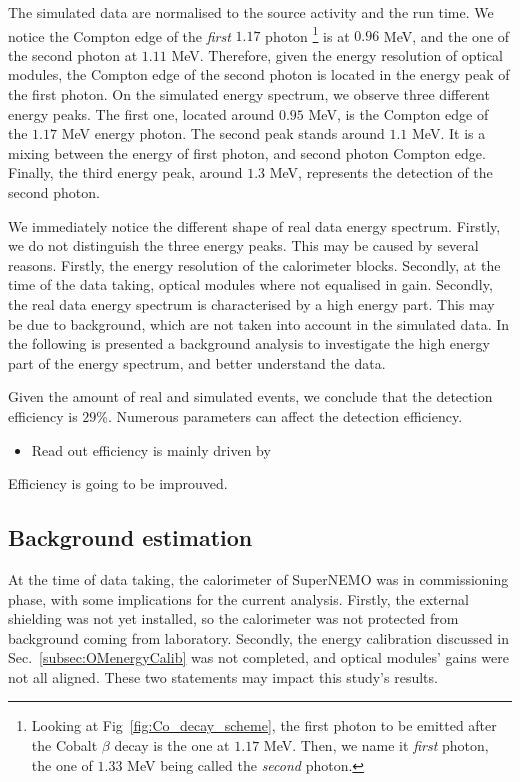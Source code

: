 The simulated data are normalised to the source activity and the run time.
We notice the Compton edge of the \emph{first} $1.17$ photon
\footnote{Looking at Fig~\ref{fig:Co_decay_scheme}, the first photon to be emitted after the Cobalt $\beta$ decay is the one at $1.17$ MeV.
  Then, we name it \emph{first} photon, the one of $1.33$ MeV being called the \emph{second} photon.}
is at $0.96$ MeV, and the one of the second photon at $1.11$ MeV.
Therefore, given the energy resolution of optical modules, the Compton edge of the second photon is located in the energy peak of the first photon.
On the simulated energy spectrum, we observe three different energy peaks.
The first one, located around $0.95$ MeV, is the Compton edge of the $1.17$ MeV energy photon.
The second peak stands around $1.1$ MeV. It is a mixing between the energy of first photon, and second photon Compton edge.
Finally, the third energy peak, around $1.3$ MeV, represents the detection of the second photon.

We immediately notice the different shape of real data energy spectrum.
Firstly, we do not distinguish the three energy peaks.
This may be caused by several reasons.
Firstly, the energy resolution of the calorimeter blocks.
Secondly, at the time of the data taking, optical modules where not equalised in gain.
Secondly, the real data energy spectrum is characterised by a high energy part.
This may be due to background, which are not taken into account in the simulated data.
In the following is presented a background analysis to investigate the high energy part of the energy spectrum, and better understand the data.

Given the amount of real and simulated events, we conclude that the detection efficiency is $29$\%.
Numerous parameters can affect the detection efficiency.
\begin{itemize}
\item Read out efficiency is mainly driven by
\end{itemize}



Efficiency is going to be improuved.

\subsection{Background estimation}

At the time of data taking, the calorimeter of SuperNEMO was in commissioning phase, with some implications for the current analysis.
Firstly, the external shielding was not yet installed, so the calorimeter was not protected from background coming from laboratory.
Secondly, the energy calibration discussed in Sec.~\ref{subsec:OMenergyCalib} was not completed, and optical modules' gains were not all aligned.
These two statements may impact this study's results.

